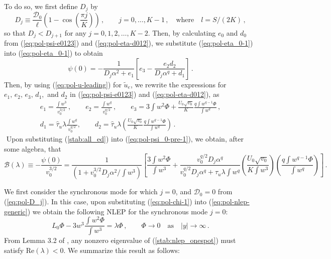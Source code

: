 \documentclass{article}%
\newcommand{\bsub}{\begin{subequations}}
\newcommand{\esub}{\end{subequations}$\!$}
\begin{document}
To do so, we first define $D_{j}$ by
\begin{equation}
D_{j}\equiv\frac{{\mathcal D}_{0}}{\ell}
 \left( 1-\cos\left( \frac{\pi j}{K}\right)\right)\,, \qquad
 j=0,\ldots,K-1 \,, \quad \mbox{where}  \quad l={S/(2K)} \,, \label{eq:pol-D_j}
\end{equation}
so that $D_{j}<D_{j+1}$ for any $j=0,1,2,\ldots,K-2$. Then, by calculating
$e_0$ and $d_0$ from (\ref{eq:pol-psi-e0123}) and
(\ref{eq:pol-eta-d012}), we substitute (\ref{eq:pol-eta_0-1}) into
(\ref{eq:pol-eta_0-1}) to obtain
\begin{equation}
\psi(0)  =  -\frac{1}{D_{j}\alpha^2 +e_{1}}\left[e_{3}-
\frac{e_{2}d_{2}}{D_{j}\alpha^q+d_{1}} \right]\,. \label{eq:pol-psi_0-pre-1}
\end{equation}
Then, by using (\ref{eq:pol-u-leading}) for $\tilde{u}_{e}$, we
rewrite the expressions for $e_{1},\, e_{2},\, e_{3},\, d_{1},$ and
$d_{2}$ in (\ref{eq:pol-psi-e0123}) and (\ref{eq:pol-eta-d012}), as
\bsub \label{stab:all_ed}
\begin{gather}
e_{1}=\frac{\int w^{3}}{v_{0}^{3/2}}\,,\qquad
 e_{2}=\frac{\int w^{q}}{v_{0}^{q/2}}\,,\qquad
e_{3}=3\int w^{2}\Phi+\frac{U_{0}\sqrt{v_{0}}}{K}\frac{q \int w^{q-1}\Phi}
{\int w^{q}} \,, \\
d_{1}=\hat{\tau}_{u}\lambda\frac{\int w^{q}}{v_{0}^{q/2}},\qquad
 d_{2}=\hat{\tau}_{u}\lambda\left(\frac{U_{0}\sqrt{v_{0}}}{K}
\frac{q\int w^{q-1}\Phi}{\int w^{q}}\right)\,.
\end{gather}
\esub
Upon substituting (\ref{stab:all_ed}) into (\ref{eq:pol-psi_0-pre-1}), we
obtain, after some algebra, that
\begin{equation}
 {\mathcal B}(\lambda) \equiv -\frac{\psi(0)}{v_{0}^{3/2}}=
\frac{1}{\left(1+{v_{0}^{3/2}D_{j}\alpha^2/\int w^{3}}
\right)}\left[\frac{3\int w^{2}\Phi}{\int w^{3}}+
 \frac{v_{0}^{q/2}D_{j}\alpha^q}{v_{0}^{q/2}D_{j}\alpha^q +
 \hat{\tau}_u \lambda \int w^q }\left(\frac{U_{0}\sqrt{v_{0}}}
{K\int w^{3}}\right) \left(\frac{q\int w^{q-1}\Phi}{\int w^{q}}\right)\right]\,. 
\label{eq:pol-chi-1}
\end{equation}

We first consider the synchronous mode for which $j=0$, and ${\mathcal
  D}_0=0$ from (\ref{eq:pol-D_j}). In this case, upon substituting
(\ref{eq:pol-chi-1}) into (\ref{eq:pol-nlep-generic}) we obtain the
following NLEP for the synchronous mode $j=0$:
\begin{equation}\label{stab:nlep_onespot}
L_{0}\Phi-3w^{3}\frac{\int w^{2}\Phi}{\int w^{3}}=\lambda\Phi\,, \qquad
\Phi \to 0 \quad \mbox{as} \quad |y|\to \infty \,.
\end{equation}
From Lemma 3.2 of \cite{kww_crime}, any nonzero eigenvalue of
(\ref{stab:nlep_onespot}) must satisfy $\mbox{Re}(\lambda)<0$. We
summarize this result as follows:
\end{document}
